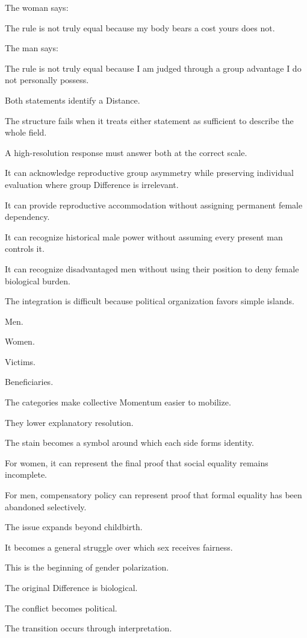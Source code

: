The woman says:

The rule is not truly equal because my body bears a cost yours does not.

The man says:

The rule is not truly equal because I am judged through a group advantage I do not personally possess.

Both statements identify a Distance.

The structure fails when it treats either statement as sufficient to describe the whole field.

A high-resolution response must answer both at the correct scale.

It can acknowledge reproductive group asymmetry while preserving individual evaluation where group Difference is irrelevant.

It can provide reproductive accommodation without assigning permanent female dependency.

It can recognize historical male power without assuming every present man controls it.

It can recognize disadvantaged men without using their position to deny female biological burden.

The integration is difficult because political organization favors simple islands.

Men.

Women.

Victims.

Beneficiaries.

The categories make collective Momentum easier to mobilize.

They lower explanatory resolution.

The stain becomes a symbol around which each side forms identity.

For women, it can represent the final proof that social equality remains incomplete.

For men, compensatory policy can represent proof that formal equality has been abandoned selectively.

The issue expands beyond childbirth.

It becomes a general struggle over which sex receives fairness.

This is the beginning of gender polarization.

The original Difference is biological.

The conflict becomes political.

The transition occurs through interpretation.

